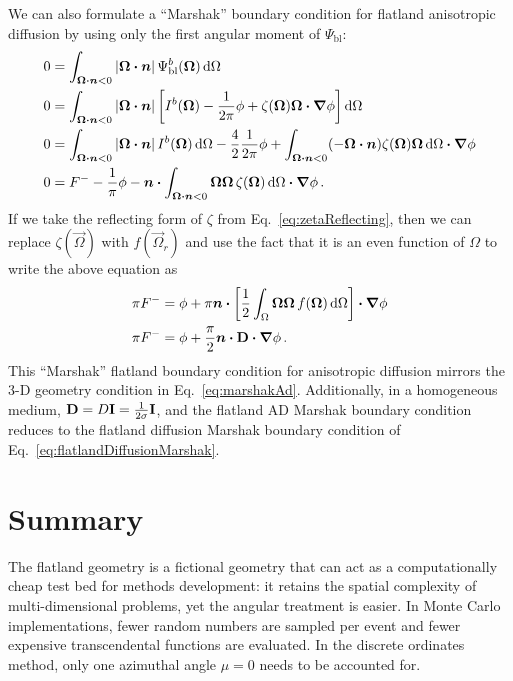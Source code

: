 We can also formulate a ``Marshak'' boundary condition for flatland anisotropic
diffusion by using only the first angular moment of $\Psi_\mathrm{bl}$:
\begin{align*}
  0 &= \int_{\bm{\Omega}\bm{\cdot} \bm{n} < 0}
  \left| \bm{\Omega}\bm{\cdot} \bm{n} \right| \Psi_\mathrm{bl}^b(\bm{\Omega}) \mathop{}\!\mathrm{d} \Omega
  \\
  0 &= \int_{\bm{\Omega}\bm{\cdot} \bm{n} < 0}
  \left| \bm{\Omega}\bm{\cdot} \bm{n} \right| 
  \left[ I^b(\bm{\Omega}) - \frac{1}{2\pi} \phi
  + \zeta(\bm{\Omega}) \bm{\Omega}\bm{\cdot} \bm{\nabla} \phi \right] \mathop{}\!\mathrm{d} \Omega
  \\
  0 &= \int_{\bm{\Omega}\bm{\cdot} \bm{n} < 0}
  \left| \bm{\Omega}\bm{\cdot} \bm{n} \right| I^b(\bm{\Omega}) \mathop{}\!\mathrm{d} \Omega
  -  \frac{4}{2} \frac{1}{2\pi} \phi
  + \int_{\bm{\Omega}\bm{\cdot} \bm{n} < 0} (- \bm{\Omega}\bm{\cdot}
  \bm{n}) \zeta(\bm{\Omega}) \bm{\Omega} \mathop{}\!\mathrm{d} \Omega \bm{\cdot} \bm{\nabla} \phi
  \\
  0 &= F^-
  - \frac{1}{\pi} \phi
  - \bm{n} \bm{\cdot} \int_{\bm{\Omega}\bm{\cdot} \bm{n} < 0} \bm{\Omega} \bm{\Omega}\,
  \zeta(\bm{\Omega}) \mathop{}\!\mathrm{d} \Omega \bm{\cdot} \bm{\nabla} \phi\,.
\end{align*}
If we take the reflecting form of $\zeta$ from Eq.~\eqref{eq:zetaReflecting},
then we can replace $\zeta(\vec{\Omega})$ with $f(\vec{\Omega}_r)$ and use the
fact that it is an even function of $\Omega$ to write the above equation as
\begin{align*}
  \pi F^-
  &= \phi
  + \pi \bm{n} \bm{\cdot} \left[ \frac{1}{2} \int_{\Omega} \bm{\Omega}
  \bm{\Omega}\, f(\bm{\Omega}) \mathop{}\!\mathrm{d} \Omega \right] \bm{\cdot} \bm{\nabla} \phi
  \\
  \pi F^-
  &= \phi
  + \frac{\pi}{2} \bm{n} \bm{\cdot} \mathbf{D} \bm{\cdot} \bm{\nabla} \phi\,.
\end{align*}
This ``Marshak'' flatland boundary condition for anisotropic diffusion mirrors
the 3-D geometry condition in Eq.~\eqref{eq:marshakAd}. Additionally, in a homogeneous
medium,
$\mathbf{D}= D \mathbf{I} = \frac{1}{2\sigma} \mathbf{I}$, and the flatland AD
Marshak boundary condition
reduces to the flatland diffusion Marshak boundary condition of
Eq.~\eqref{eq:flatlandDiffusionMarshak}.

\section{Summary}
The flatland geometry is a fictional geometry that can act as a computationally
cheap test bed for methods development: it retains the spatial complexity of
multi-dimensional problems, yet the angular treatment is easier. In Monte Carlo
implementations, fewer random numbers are sampled per event and fewer expensive
transcendental functions are evaluated. In the discrete ordinates method, only
one azimuthal angle $\mu=0$ needs to be accounted for.

